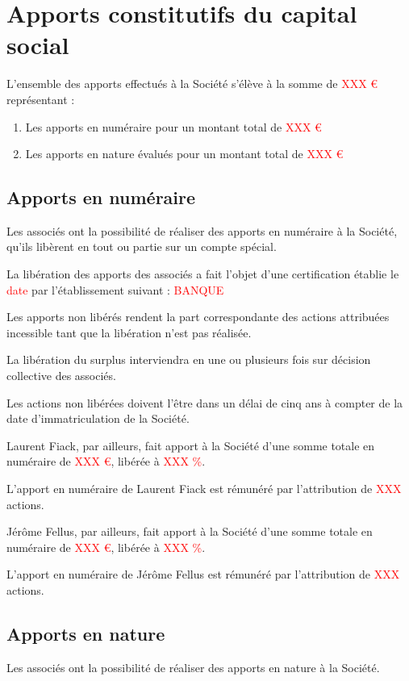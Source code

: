 \documentclass[a4paper,12pt]{report}
\begin{document}
\section{Apports constitutifs du capital social}
L'ensemble des apports effectués à la Société s'élève à la somme de \textcolor{red}{XXX €} représentant :
\begin{enumerate}
	\item Les apports en numéraire pour un montant total de \textcolor{red}{XXX €}
	\item Les apports en nature évalués pour un montant total de \textcolor{red}{XXX €}
\end{enumerate}

\subsection{Apports en numéraire}
Les associés ont la possibilité de réaliser des apports en numéraire à la Société, qu'ils libèrent en tout ou partie sur un compte spécial.

La libération des apports des associés a fait l'objet d'une certification établie le \textcolor{red}{date} par l'établissement suivant : \textcolor{red}{BANQUE}

Les apports non libérés rendent la part correspondante des actions attribuées incessible tant que la libération n'est pas réalisée.

La libération du surplus interviendra en une ou plusieurs fois sur décision collective des associés.

Les actions non libérées doivent l'être dans un délai de cinq ans à compter de la date d'immatriculation de la Société.

Laurent Fiack, par ailleurs, fait apport à la Société d'une somme totale en numéraire de \textcolor{red}{XXX €}, libérée à \textcolor{red}{XXX \%}.

L'apport en numéraire de Laurent Fiack est rémunéré par l'attribution de \textcolor{red}{XXX} actions.

Jérôme Fellus, par ailleurs, fait apport à la Société d'une somme totale en numéraire de \textcolor{red}{XXX €}, libérée à \textcolor{red}{XXX \%}.

L'apport en numéraire de Jérôme Fellus est rémunéré par l'attribution de \textcolor{red}{XXX} actions.

\subsection{Apports en nature}
Les associés ont la possibilité de réaliser des apports en nature à la Société.
\end{document}
